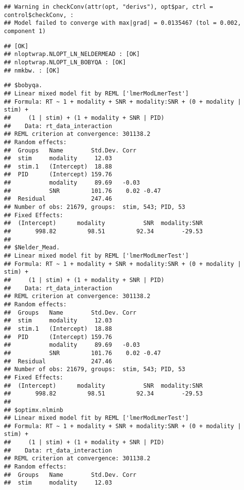 \documentclass[
]{article}
\begin{document}
\begin{verbatim}
## Warning in checkConv(attr(opt, "derivs"), opt$par, ctrl = control$checkConv, :
## Model failed to converge with max|grad| = 0.0135467 (tol = 0.002, component 1)
\end{verbatim}

\begin{verbatim}
## [OK]
## nloptwrap.NLOPT_LN_NELDERMEAD : [OK]
## nloptwrap.NLOPT_LN_BOBYQA : [OK]
## nmkbw. : [OK]
\end{verbatim}

\begin{verbatim}
## $bobyqa.
## Linear mixed model fit by REML ['lmerModLmerTest']
## Formula: RT ~ 1 + modality + SNR + modality:SNR + (0 + modality | stim) +  
##     (1 | stim) + (1 + modality + SNR | PID)
##    Data: rt_data_interaction
## REML criterion at convergence: 301138.2
## Random effects:
##  Groups   Name        Std.Dev. Corr       
##  stim     modality     12.03              
##  stim.1   (Intercept)  18.88              
##  PID      (Intercept) 159.76              
##           modality     89.69   -0.03      
##           SNR         101.76    0.02 -0.47
##  Residual             247.46              
## Number of obs: 21679, groups:  stim, 543; PID, 53
## Fixed Effects:
##  (Intercept)      modality           SNR  modality:SNR  
##       998.82         98.51         92.34        -29.53  
## 
## $Nelder_Mead.
## Linear mixed model fit by REML ['lmerModLmerTest']
## Formula: RT ~ 1 + modality + SNR + modality:SNR + (0 + modality | stim) +  
##     (1 | stim) + (1 + modality + SNR | PID)
##    Data: rt_data_interaction
## REML criterion at convergence: 301138.2
## Random effects:
##  Groups   Name        Std.Dev. Corr       
##  stim     modality     12.03              
##  stim.1   (Intercept)  18.88              
##  PID      (Intercept) 159.76              
##           modality     89.69   -0.03      
##           SNR         101.76    0.02 -0.47
##  Residual             247.46              
## Number of obs: 21679, groups:  stim, 543; PID, 53
## Fixed Effects:
##  (Intercept)      modality           SNR  modality:SNR  
##       998.82         98.51         92.34        -29.53  
## 
## $optimx.nlminb
## Linear mixed model fit by REML ['lmerModLmerTest']
## Formula: RT ~ 1 + modality + SNR + modality:SNR + (0 + modality | stim) +  
##     (1 | stim) + (1 + modality + SNR | PID)
##    Data: rt_data_interaction
## REML criterion at convergence: 301138.2
## Random effects:
##  Groups   Name        Std.Dev. Corr       
##  stim     modality     12.03              

\end{verbatim}
\end{document}
